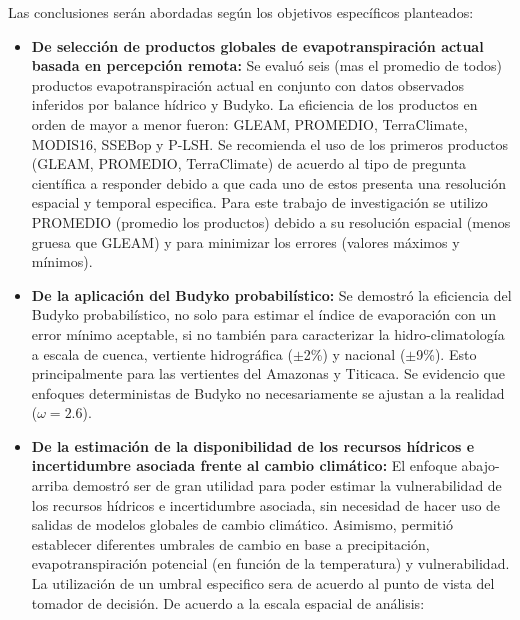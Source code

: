 \documentclass[12pt]{article}
\begin{document}
Las conclusiones serán abordadas según los objetivos específicos planteados:

\begin{itemize}
    \item \textbf{De selección de productos globales de evapotranspiración actual basada en percepción remota:} Se evaluó seis (mas el promedio de todos) productos evapotranspiración actual en conjunto con datos observados inferidos por balance hídrico y Budyko. La eficiencia de los productos en orden de mayor a menor fueron: GLEAM, PROMEDIO, TerraClimate, MODIS16, SSEBop y P-LSH. Se recomienda el uso de los primeros productos (GLEAM, PROMEDIO, TerraClimate) de acuerdo al tipo de pregunta científica a responder debido a que cada uno de estos presenta una resolución espacial y temporal especifica. Para este trabajo de investigación se utilizo PROMEDIO (promedio los productos) debido a su resolución espacial (menos gruesa que GLEAM) y para minimizar los errores (valores máximos y mínimos).
   
    \item \textbf{De la aplicación del Budyko probabilístico:}
    Se demostró la eficiencia del Budyko probabilístico, no solo para estimar el índice de evaporación con un error mínimo aceptable, si no también para caracterizar la hidro-climatología a escala de cuenca, vertiente hidrográfica ($\pm$2\%) y nacional ($\pm$9\%). Esto principalmente para las vertientes del Amazonas y Titicaca. Se evidencio que enfoques deterministas de Budyko no necesariamente se ajustan a la realidad ($\omega = 2.6$).
    
    \item \textbf{De la estimación de la disponibilidad de los recursos hídricos e incertidumbre asociada frente al cambio climático:} El enfoque abajo-arriba demostró ser de gran utilidad para poder estimar la vulnerabilidad de los recursos hídricos e incertidumbre asociada, sin necesidad de hacer uso de salidas de modelos globales de cambio climático. Asimismo, permitió establecer diferentes umbrales de cambio en base a precipitación, evapotranspiración potencial (en función de la temperatura) y vulnerabilidad. La utilización de un umbral especifico sera de acuerdo al punto de vista del tomador de decisión. De acuerdo a la escala espacial de análisis:
    

\end{itemize}
\end{document}

